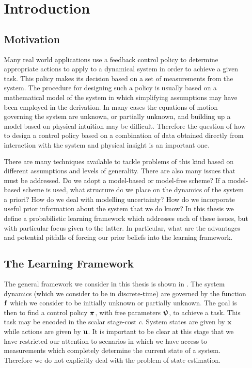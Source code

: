 \chapter{I\lowercase{ntroduction}}

\section{Motivation}
Many real world applications use a feedback control policy to determine appropriate actions to apply to a dynamical system in order to achieve a given task. This policy makes its decision based on a set of measurements from the system. The procedure for designing such a policy is usually based on a mathematical model of the system in which simplifying assumptions may have been employed in the derivation. In many cases the equations of motion governing the system are unknown, or partially unknown, and building up a model based on physical intuition may be difficult. Therefore the question of how to design a control policy based on a combination of data obtained directly from interaction with the system and physical insight is an important one.


There are many techniques available to tackle problems of this kind based on different assumptions and levels of generality. There are also many issues that must be addressed. Do we adopt a model-based or model-free scheme? If a model-based scheme is used, what structure do we place on the dynamics of the system a priori? How do we deal with modelling uncertainty? How do we incorporate useful prior information about the system that we do know? In this thesis we define a probabilistic learning framework which addresses each of these issues, but with particular focus given to the latter. In particular, what are the advantages and potential pitfalls of forcing our prior beliefs into the learning framework.


\section{The Learning Framework}

The general framework we consider in this thesis is shown in . The system dynamics (which we consider to be in discrete-time) are governed by the function $\mathbf{f}$ which we consider to be initially unknown or partially unknown. The goal is then to find a control policy $\boldsymbol{\pi}$, with free parameters $\boldsymbol{\psi}$, to achieve a task. This task may be encoded in the scalar stage-cost $c$. System states are given by $\mathbf{x}$ while actions are given by $\mathbf{u}$. It is important to be clear at this stage that we have restricted our attention to scenarios in which we have access to measurements which completely determine the current state of a system. Therefore we do not explicitly deal with the problem of state estimation.




